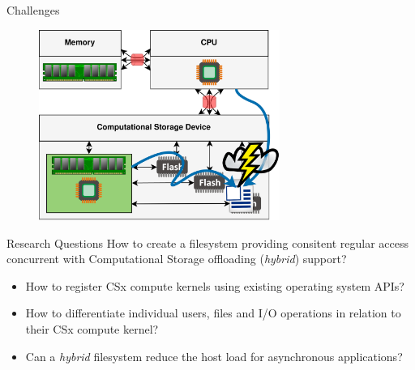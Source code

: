 \documentclass{beamer}
\begin{document}
\begin{frame}{Challenges}
	\begingroup
	\small
	\begin{figure}
		\centering
		\includegraphics[width=0.7\textwidth]{resources/images/challenges.png}
	\end{figure}
	\endgroup
\end{frame}

% 
\begin{frame}{Research Questions}
	\begingroup
	\small
		How to create a filesystem providing consitent regular access concurrent
		with Computational Storage offloading (\textit{hybrid}) support?
	\begin{itemize}
		\item How to register CSx compute kernels using existing operating 
			  system APIs?
  		\item How to differentiate individual users, files and I/O operations in
			  relation to their CSx compute kernel?
		\item Can a \textit{hybrid} filesystem reduce the host load for
              asynchronous applications?
	\end{itemize}
	\endgroup
\end{frame}
\end{document}
